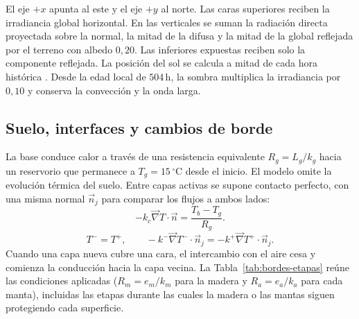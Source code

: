 El eje $+x$ apunta al este y el eje $+y$ al norte. Las caras superiores reciben la irradiancia global horizontal. En las verticales se suman la radiación directa proyectada sobre la normal, la mitad de la difusa y la mitad de la global reflejada por el terreno con albedo $0{,}20$. Las inferiores expuestas reciben solo la componente reflejada. La posición del sol se calcula a mitad de cada hora histórica \citep{noaaSolar}. Desde la edad local de $504\,\mathrm h$, la sombra multiplica la irradiancia por $0{,}10$ y conserva la convección y la onda larga.

\subsection{Suelo, interfaces y cambios de borde}
La base conduce calor a través de una resistencia equivalente $R_g=L_g/k_g$ hacia un reservorio que permanece a $T_g=15\,^\circ\mathrm C$ desde el inicio. El modelo omite la evolución térmica del suelo. Entre capas activas se supone contacto perfecto, con una misma normal $\vec n_j$ para comparar los flujos a ambos lados:
\begin{equation}
  -k_c\vec{\nabla} T\cdot\vec{n}=\frac{T_b-T_g}{R_g}.
  \label{eq:borde-suelo}
\end{equation}
\begin{equation}
  T^-=T^+,\qquad
  -k^-\vec{\nabla} T^-\cdot\vec{n}_j
  =-k^+\vec{\nabla} T^+\cdot\vec{n}_j.
  \label{eq:contacto-capas}
\end{equation}
Cuando una capa nueva cubre una cara, el intercambio con el aire cesa y comienza la conducción hacia la capa vecina. La Tabla~\ref{tab:bordes-etapas} reúne las condiciones aplicadas ($R_m=e_m/k_m$ para la madera y $R_a=e_a/k_a$ para cada manta), incluidas las etapas durante las cuales la madera o las mantas siguen protegiendo cada superficie.
